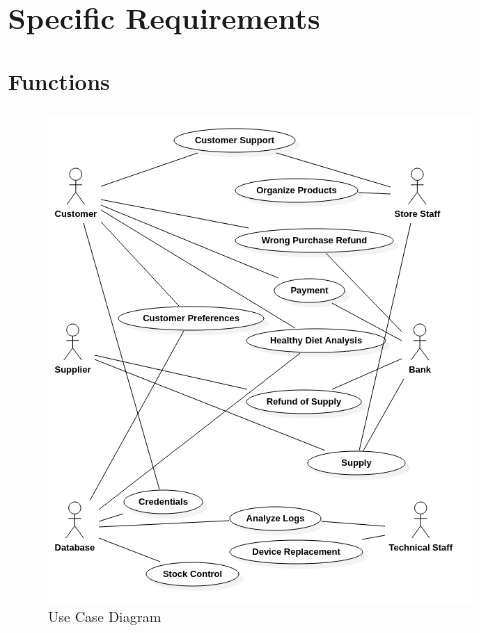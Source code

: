 \chapter{Specific Requirements}
\label{Specific Requirements}


\section{Functions}
\begin{figure} [H]
    \centering
    \includegraphics[width=\linewidth]{content/specificRequirements/img/UseCaseDiagram.png}
    \caption{Use Case Diagram}
    \label{fig:use_case_diagram}
\end{figure}












